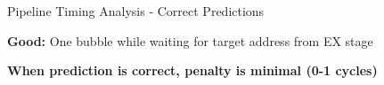 \documentclass[aspectratio=169,12pt]{beamer}
\begin{document}
\begin{frame}{Pipeline Timing Analysis - Correct Predictions}
\begin{center}
{\begin{minipage}{0.95\textwidth}
\vspace{0.05cm}
\footnotesize \textbf{Good:} One bubble while waiting for target address from EX stage
\end{minipage}
}
\end{center}

\vspace{0.3cm}


\begin{center}
\large
\textcolor{green!70!black}{\textbf{When prediction is correct, penalty is minimal (0-1 cycles)}}
\end{center}

\end{frame}
\end{document}
